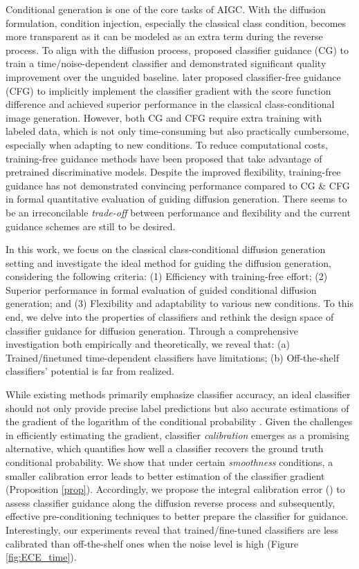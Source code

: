 \documentclass{article}
\theoremstyle{definition}
\begin{document}
Conditional generation is one of the core tasks of AIGC.
With the diffusion formulation, condition injection, especially the classical class condition, becomes more transparent as it can be modeled as an extra term during the reverse process. 
To align with the diffusion process, \cite{dhariwal2021diffusion} proposed classifier guidance (CG) to train a time/noise-dependent classifier and demonstrated significant quality improvement over the unguided baseline. 
\cite{ho2022classifier} later proposed classifier-free guidance (CFG) to implicitly implement the classifier gradient with the score function difference and achieved superior performance in the classical class-conditional image generation. 
However, both CG and CFG require extra training with labeled data, which is not only time-consuming but also practically cumbersome, especially when adapting to new conditions. 
To reduce computational costs, training-free guidance methods have been proposed \citep{bansal2023universal} that take advantage of pretrained discriminative models.
Despite the improved flexibility, training-free guidance has not demonstrated convincing performance compared to CG \& CFG in formal quantitative evaluation of guiding diffusion generation.  
There seems to be an irreconcilable \textit{trade-off} between performance and flexibility and the current guidance schemes are still to be desired. 


In this work, we focus on the classical class-conditional diffusion generation setting and investigate the ideal method for guiding the diffusion generation, considering the following criteria:
(1) Efficiency with training-free effort;
(2) Superior performance in formal evaluation of guided conditional diffusion generation;
and (3) Flexibility and adaptability to various new conditions.
To this end, we delve into the properties of classifiers and rethink the design space of classifier guidance for diffusion generation. 
Through a comprehensive investigation both empirically and theoretically, we reveal that: (a) Trained/finetuned time-dependent classifiers have limitations; (b) Off-the-shelf classifiers' potential is far from realized.


While existing methods primarily emphasize classifier accuracy, an ideal classifier should not only provide precise label predictions but also accurate estimations of the gradient of the logarithm of the conditional probability \citep{dhariwal2021diffusion, ho2022classifier,chen2022sampling}. Given the challenges in efficiently estimating the gradient, classifier \textit{calibration} emerges as a promising alternative, which quantifies how well a classifier recovers the ground truth conditional probability. 
We show that under certain \textit{smoothness} conditions, a smaller calibration error leads to better estimation of the classifier gradient (Proposition \ref{prop}). 
Accordingly, we propose the integral calibration error () to assess classifier guidance along the diffusion reverse process and subsequently, effective pre-conditioning techniques to better prepare the classifier for guidance. 
Interestingly, our experiments reveal that trained/fine-tuned classifiers \citep{dhariwal2021diffusion} are less calibrated than off-the-shelf ones when the noise level is high (Figure \ref{fig:ECE_time}). 
\end{document}
